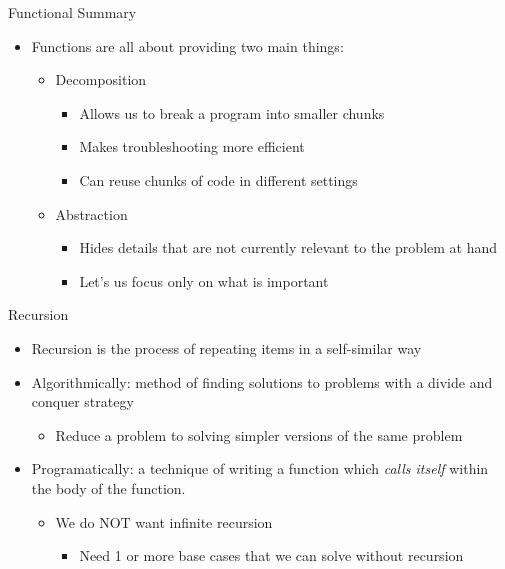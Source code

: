 \documentclass[pdf, aspectratio=169, 12pt]{beamer}
\begin{document}
\begin{frame}{Functional Summary}
	\begin{itemize}
		\item Functions are all about providing two main things:
			\begin{itemize}
				\item Decomposition
					\begin{itemize}
						\item Allows us to break a program into smaller chunks
						\item Makes troubleshooting more efficient
						\item Can reuse chunks of code in different settings
					\end{itemize}
				\item Abstraction
					\begin{itemize}
						\item Hides details that are not currently relevant to the problem at hand
						\item Let's us focus only on what is important
					\end{itemize}
			\end{itemize}
	\end{itemize}
\end{frame}

\begin{frame}{Recursion}
	\begin{itemize}[<+->]
		\item \alert{Recursion} is the process of repeating items in a self-similar way
		\item Algorithmically: method of finding solutions to problems with a divide and conquer strategy
			\begin{itemize}
				\item Reduce a problem to solving simpler versions of the same problem
			\end{itemize}
		\item Programatically: a technique of writing a function which \emph{calls itself} within the body of the function.
			\begin{itemize}
				\item We do NOT want infinite recursion
					\begin{itemize}
						\item Need 1 or more \alert{base cases} that we can solve without recursion
					\end{itemize}
			\end{itemize}
	\end{itemize}
\end{frame}
\end{document}
